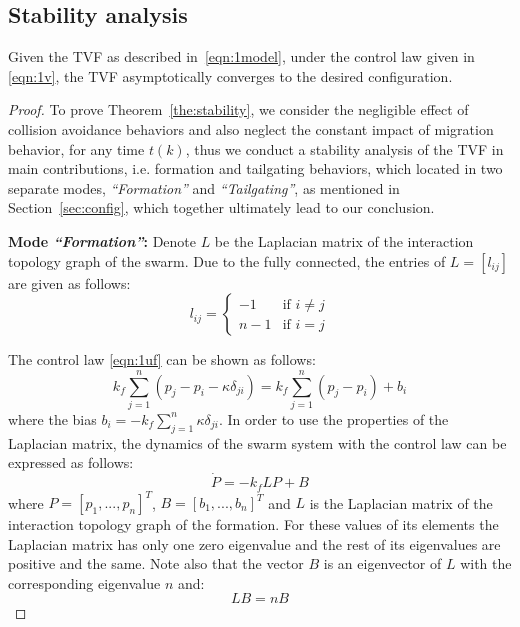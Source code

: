 \subsection{Stability analysis}
\begin{theorem}\label{the:stability}
Given the TVF as described in~\eqref{eqn:1model}, under the control law given in \eqref{eqn:1v}, the TVF asymptotically converges to the desired configuration.
\end{theorem}
\begin{proof}
To prove Theorem~\ref{the:stability}, we consider the negligible effect of collision avoidance behaviors and also neglect the constant impact of migration behavior, for any time $t(k)$, thus we conduct a stability analysis of the TVF in main contributions, i.e. formation and tailgating behaviors, which located in two separate modes, \textit{``Formation''} and \textit{``Tailgating''}, as mentioned in Section~\ref{sec:config}, which together ultimately lead to our conclusion.

\textbf{Mode \textit{``Formation''}:} Denote $L$ be the Laplacian matrix of the interaction topology graph of the swarm. Due to the fully connected, the entries of $L=\left[l_{ij}\right]$ are given as follows:
\begin{equation}
    l_{ij}=\begin{cases}
    -1 & \text{if }i\neq j \\
    n-1 & \text{if }i=j
    \end{cases}
\end{equation}

The control law \eqref{eqn:1uf} can be shown as follows:
\begin{equation}
    k_f\sum_{j=1}^n{\left(p_j-p_i-\kappa \delta_{ji}\right)}=k_f\sum_{j=1}^n{\left(p_j-p_i\right)}+b_i
\end{equation}
where the bias $b_i=-k_f\sum_{j=1}^n\kappa \delta_{ji}$.  In order to use the properties of the Laplacian matrix, the dynamics of the swarm system with the control law can be expressed as follows:
\begin{equation}
    \dot{P}=-k_fLP+B
\end{equation}
where $P=\left[p_1,...,p_n\right]^T$, $B=\left[b_1,...,b_n\right]^T$ and $L$ is the Laplacian matrix of the interaction topology graph of the formation. For these values of its elements the Laplacian matrix has only one zero eigenvalue and the rest of its eigenvalues are positive and the same. Note also that the vector $B$ is an eigenvector of $L$ with the corresponding eigenvalue $n$ and:
\begin{equation}
    LB=nB
\end{equation}


\end{proof}
